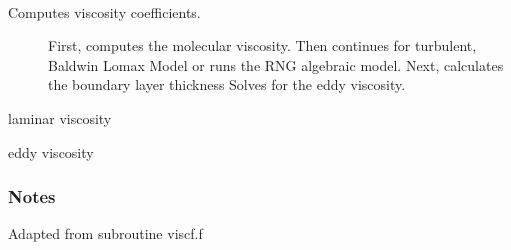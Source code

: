 \documentclass[letterpaper,10pt,english]{sphinxmanual}
\begin{document}
\begin{fulllineitems}
\label{\detokenize{autoapi/Viscosity/index:Viscosity.compute_viscosity}}~\begin{description}
\item[{Computes viscosity coefficients.}] \leavevmode
\sphinxAtStartPar
First, computes the molecular viscosity.
Then continues for turbulent, Baldwin Lomax Model
or runs the RNG algebraic model.
Next, calculates the boundary layer thickness
Solves for the eddy viscosity.

\end{description}

\begin{fulllineitems}
\label{\detokenize{autoapi/Viscosity/index:Viscosity.rlv}}
\sphinxAtStartPar
laminar viscosity

\end{fulllineitems}


\begin{fulllineitems}
\label{\detokenize{autoapi/Viscosity/index:Viscosity.rev}}
\sphinxAtStartPar
eddy viscosity

\end{fulllineitems}

\subsubsection*{Notes}

\sphinxAtStartPar
Adapted from subroutine viscf.f

\end{fulllineitems}



\section{}
\label{\detokenize{autoapi/bcfar_wrap/index:module-bcfar_wrap}}\label{\detokenize{autoapi/bcfar_wrap/index:bcfar-wrap}}\label{\detokenize{autoapi/bcfar_wrap/index::doc}}
\end{document}
